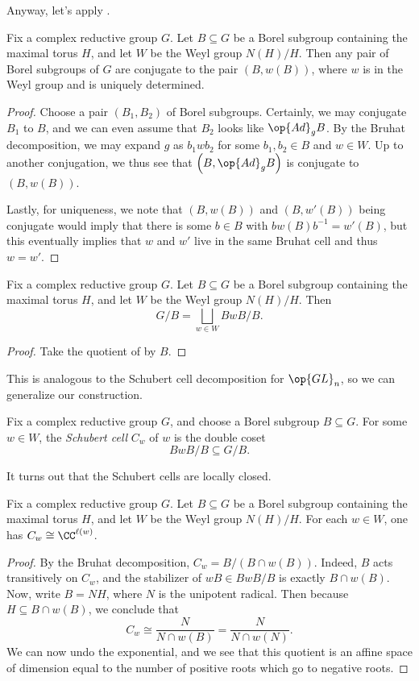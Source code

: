 \documentclass[../notes.tex]{subfiles}
\begin{document}
Anyway, let's apply .
\begin{corollary}
	Fix a complex reductive group $G$. Let $B\subseteq G$ be a Borel subgroup containing the maximal torus $H$, and let $W$ be the Weyl group $N(H)/H$. Then any pair of Borel subgroups of $G$ are conjugate to the pair $(B,w(B))$, where $w$ is in the Weyl group and is uniquely determined.
\end{corollary}
\begin{proof}
	Choose a pair $(B_1,B_2)$ of Borel subgroups. Certainly, we may conjugate $B_1$ to $B$, and we can even assume that $B_2$ looks like $\op{Ad}_gB$. By the Bruhat decomposition, we may expand $g$ as $b_1wb_2$ for some $b_1,b_2\in B$ and $w\in W$. Up to another conjugation, we thus see that $\left(B,\op{Ad}_gB\right)$ is conjugate to $(B,w(B))$.

	Lastly, for uniqueness, we note that $(B,w(B))$ and $(B,w'(B))$ being conjugate would imply that there is some $b\in B$ with $bw(B)b^{-1}=w'(B)$, but this eventually implies that $w$ and $w'$ live in the same Bruhat cell and thus $w=w'$.
\end{proof}
\begin{corollary}
	Fix a complex reductive group $G$. Let $B\subseteq G$ be a Borel subgroup containing the maximal torus $H$, and let $W$ be the Weyl group $N(H)/H$. Then
	\[G/B=\bigsqcup_{w\in W}BwB/B.\]
\end{corollary}
\begin{proof}
	Take the quotient of  by $B$.
\end{proof}
This is analogous to the Schubert cell decomposition for $\op{GL}_n$, so we can generalize our construction.
\begin{definition}
	Fix a complex reductive group $G$, and choose a Borel subgroup $B\subseteq G$. For some $w\in W$, the \textit{Schubert cell} $C_w$ of $w$ is the double coset
	\[BwB/B\subseteq G/B.\]
\end{definition}
\begin{remark}
	It turns out that the Schubert cells are locally closed.
\end{remark}
\begin{lemma} \label{lem:cell-decomp-flag}
	Fix a complex reductive group $G$. Let $B\subseteq G$ be a Borel subgroup containing the maximal torus $H$, and let $W$ be the Weyl group $N(H)/H$. For each $w\in W$, one has $C_w\cong\CC^{\ell(w)}$.
\end{lemma}
\begin{proof}
	By the Bruhat decomposition, $C_w=B/(B\cap w(B))$. Indeed, $B$ acts transitively on $C_w$, and the stabilizer of $wB\in BwB/B$ is exactly $B\cap w(B)$. Now, write $B=NH$, where $N$ is the unipotent radical. Then because $H\subseteq B\cap w(B)$, we conclude that
	\[C_w\cong\frac{N}{N\cap w(B)}=\frac N{N\cap w(N)}.\]
	We can now undo the exponential, and we see that this quotient is an affine space of dimension equal to the number of positive roots which go to negative roots.
\end{proof}
\end{document}
